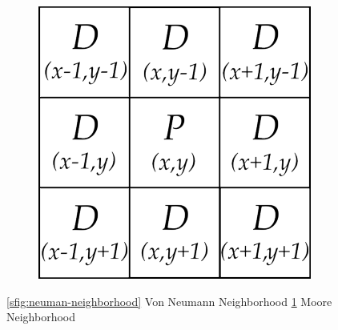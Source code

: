 \begin{figure}[ht]
\begin{subfigure}{.3\textwidth}
  \includegraphics[width=.9\linewidth]{figures/C3/moore-neighborhood.png}
  \caption{}
  \label{sfig:moore-neighborhood}
\end{subfigure}
\caption{\ref{sfig:neuman-neighborhood} Von Neumann Neighborhood \ref{sfig:moore-neighborhood} Moore Neighborhood}
\label{fig:neighborhood}
\end{figure} 

